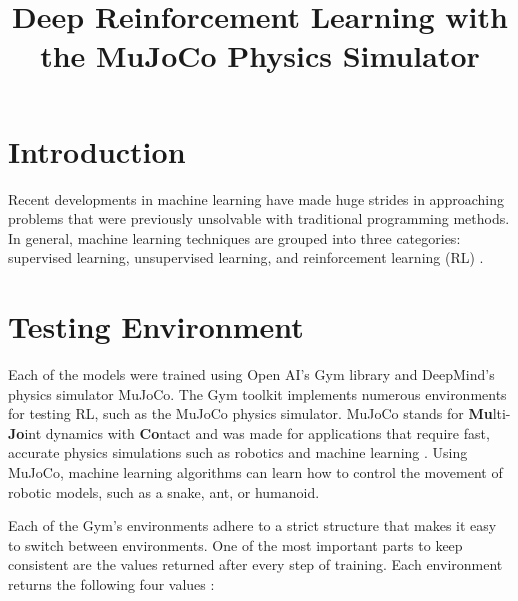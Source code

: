 \documentclass[conference]{IEEEtran}
\begin{document}
\title{Deep Reinforcement Learning with the MuJoCo Physics Simulator}

\author{
    \and
}
\maketitle

\begin{abstract}
    \blindtext
\end{abstract}

\section{Introduction}

Recent developments in machine learning have made huge strides in approaching problems that were previously unsolvable
with traditional programming methods. In general, machine learning techniques are grouped into three categories:
supervised learning, unsupervised learning, and reinforcement learning (RL) \cite{rl_application}.

\blindtext
\blinditemize[4]

\blindtext

\section{Testing Environment}

Each of the models were trained using Open AI's Gym library and DeepMind's physics simulator MuJoCo. The Gym toolkit
implements numerous environments for testing RL, such as the MuJoCo physics simulator. MuJoCo stands
for {\bf Mu}lti-{\bf Jo}int dynamics with {\bf Co}ntact and was made for applications that require fast, accurate
physics simulations such as robotics and machine learning \cite{mujoco_docs}. Using MuJoCo, machine learning
algorithms can learn how to control the movement of robotic models, such as a snake, ant, or humanoid.

Each of the Gym's environments adhere to a strict structure that makes it easy to switch between environments. One of
the most important parts to keep consistent are the values returned after every step of training. Each environment
returns the following four values \cite{gym_docs}:
\end{document}
